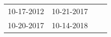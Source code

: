 \begin{supertabular}{llll}
 10-17-2012 &  10-21-2017 \\
 10-20-2017 &  10-14-2018 \\
\end{supertabular}

